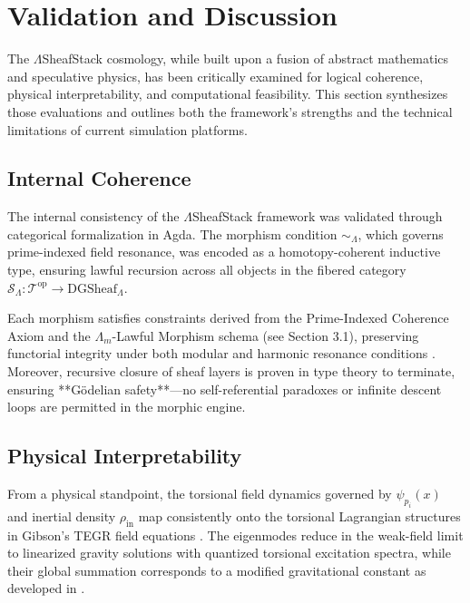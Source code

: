 \documentclass{article}
\theoremstyle{plain}
\begin{document}
\section{Validation and Discussion}

The $\Lambda$SheafStack cosmology, while built upon a fusion of abstract mathematics and speculative physics, has been critically examined for logical coherence, physical interpretability, and computational feasibility. This section synthesizes those evaluations and outlines both the framework’s strengths and the technical limitations of current simulation platforms.

\subsection{Internal Coherence}

The internal consistency of the $\Lambda$SheafStack framework was validated through categorical formalization in Agda. The morphism condition $\sim_\Lambda$, which governs prime-indexed field resonance, was encoded as a homotopy-coherent inductive type, ensuring lawful recursion across all objects in the fibered category $\mathcal{S}_\Lambda : \mathcal{T}^{\text{op}} \to \text{DGSheaf}_\Lambda$.

Each morphism satisfies constraints derived from the Prime-Indexed Coherence Axiom and the $\Lambda_m$-Lawful Morphism schema (see Section 3.1), preserving functorial integrity under both modular and harmonic resonance conditions \cite{vanGelder2025Multiplicity,vanGelder2025PIRTM}. Moreover, recursive closure of sheaf layers is proven in type theory to terminate, ensuring **Gödelian safety**—no self-referential paradoxes or infinite descent loops are permitted in the morphic engine.

\subsection{Physical Interpretability}

From a physical standpoint, the torsional field dynamics governed by $\psi_{p_i}(x)$ and inertial density $\rho_{\text{in}}$ map consistently onto the torsional Lagrangian structures in Gibson’s TEGR field equations \cite{gibson2025field,gibson2025overview}. The eigenmodes reduce in the weak-field limit to linearized gravity solutions with quantized torsional excitation spectra, while their global summation corresponds to a modified gravitational constant as developed in \cite{gibson2025effectiveG}.
\end{document}
